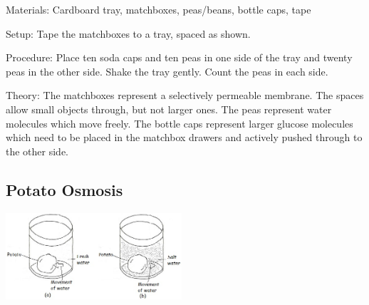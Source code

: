 \begin{multicols}{2}
\begin{description*}
\item[Materials:]{Cardboard tray, matchboxes, peas/beans, bottle caps, tape}
\item[Setup:]{Tape the matchboxes to a tray, spaced as shown.}
\item[Procedure:]{Place ten soda caps and ten peas in one
side of the tray and twenty peas in the other side. Shake the tray gently. Count the
peas in each side.}
\item[Theory:]{The
matchboxes represent a selectively
permeable membrane. The spaces
allow small objects through, but
not larger ones. The peas
represent water molecules which
move freely. The bottle caps
represent larger glucose
molecules which need to be
placed in the matchbox drawers
and actively pushed through to
the other side.}
\end{description*}

\columnbreak

\subsection{Potato Osmosis}

\begin{center}
\includegraphics[width=0.49\textwidth]{./img/vso/osmosis-potato-full.jpg}
\end{center}


\end{multicols}
